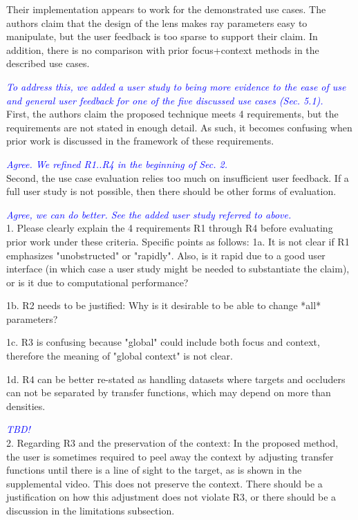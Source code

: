 \documentclass[a4paper,10pt]{article}
\newcommand{\rr}[1]{\emph{\textcolor{blue}{#1}}}
\begin{document}
    Their implementation appears to work for the demonstrated use cases. The authors
    claim that the design of the lens makes ray parameters easy to manipulate, but the
    user feedback is too sparse to support their claim. In addition, there is no
    comparison with prior focus+context methods in the described use cases.
    
    \rr{To address this, we added a user study to being more evidence to the ease of use and general user feedback for one of the five discussed
    use cases (Sec. 5.1).}\\

    First, the authors claim the proposed technique meets 4 requirements, but the requirements
    are not stated in enough detail. As such, it becomes confusing when prior work is
    discussed in the framework of these requirements. 
    
    \rr{Agree. We refined R1..R4 in the beginning of Sec. 2.}\\
    
    Second, the use case evaluation relies too much on insufficient user feedback. If a full user study is not
    possible, then there should be other forms of evaluation. 
    
    \rr{Agree, we can do better. See the added user study referred to above.}\\
    
    1. Please clearly explain the 4 requirements R1 through R4 before evaluating prior
    work under these criteria. Specific points as follows:
    1a. It is not clear if R1 emphasizes "unobstructed" or "rapidly". Also, is it
    rapid due to a good user interface (in which case a user study might be needed to
    substantiate the claim), or is it due to computational performance?

    1b. R2 needs to be justified: Why is it desirable to be able to change *all*
    parameters?

    1c. R3 is confusing because "global" could include both focus and context,
    therefore the meaning of "global context" is not clear.

    1d. R4 can be better re-stated as handling datasets where targets and occluders
    can not be separated by transfer functions, which may depend on more than
    densities.

    \rr{TBD!}\\

    2. Regarding R3 and the preservation of the context: In the proposed method, the
    user is sometimes required to peel away the context by adjusting transfer
    functions until there is a line of sight to the target, as is shown in the
    supplemental video. This does not preserve the context. There should be a
    justification on how this adjustment does not violate R3, or there should be a
    discussion in the limitations subsection.
    
\end{document}
